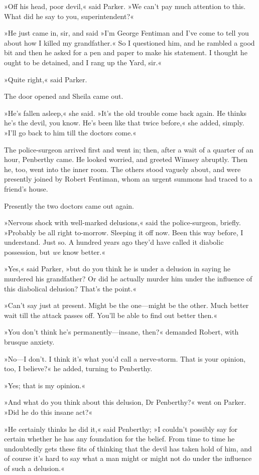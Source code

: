 »Off his head, poor devil,« said Parker. »We can't pay much attention to this. What did he say to you, superintendent?«

»He just came in, sir, and said »I'm George Fentiman and I've come to tell you about how I killed my grandfather.« So I questioned him, and he rambled a good bit and then he asked for a pen and paper to make his statement. I thought he ought to be detained, and I rang up the Yard, sir.«

»Quite right,« said Parker.

The door opened and Sheila came out.

»He's fallen asleep,« she said. »It's the old trouble come back again. He thinks he's the devil, you know. He's been like that twice before,« she added, simply. »I'll go back to him till the doctors come.«

The police-surgeon arrived first and went in; then, after a wait of a quarter of an hour, Penberthy came. He looked worried, and greeted Wimsey abruptly. Then he, too, went into the inner room. The others stood vaguely about, and were presently joined by Robert Fentiman, whom an urgent summons had traced to a friend's house.

Presently the two doctors came out again.

»Nervous shock with well-marked delusions,« said the police-surgeon, briefly. »Probably be all right to-morrow. Sleeping it off now. Been this way before, I understand. Just so. A hundred years ago they'd have called it diabolic possession, but \textit{we} know better.«

»Yes,« said Parker, »but do you think he is under a delusion in saying he murdered his grandfather? Or did he actually murder him under the influence of this diabolical delusion? That's the point.«

»Can't say just at present. Might be the one—might be the other. Much better wait till the attack passes off. You'll be able to find out better then.«

»You don't think he's permanently—insane, then?« demanded Robert, with brusque anxiety.

»No—I don't. I think it's what you'd call a nerve-storm. That is your opinion, too, I believe?« he added, turning to Penberthy.

»Yes; that is my opinion.«

»And what do you think about this delusion, Dr Penberthy?« went on Parker. »Did he do this insane act?«

»He certainly thinks he did it,« said Penberthy; »I couldn't possibly say for certain whether he has any foundation for the belief. From time to time he undoubtedly gets these fits of thinking that the devil has taken hold of him, and of course it's hard to say what a man might or might not do under the influence of such a delusion.«

